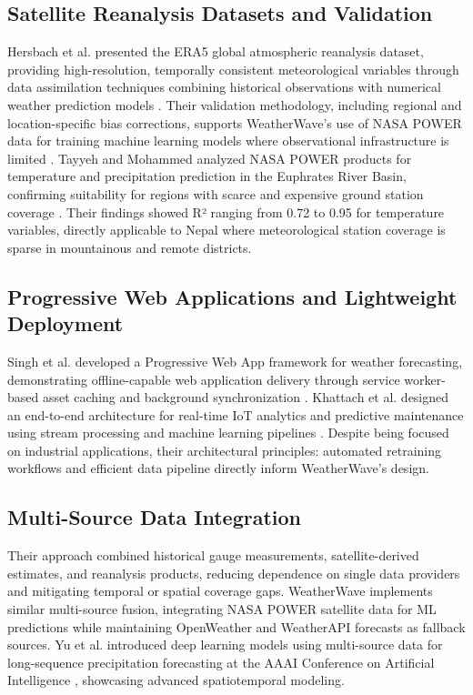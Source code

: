 \documentclass[conference]{IEEEtran}
\begin{document}
\subsection{Satellite Reanalysis Datasets and Validation}
Hersbach et al. presented the ERA5 global atmospheric reanalysis dataset, providing high-resolution, temporally consistent meteorological variables through data assimilation techniques combining historical observations with numerical weather prediction models \cite{b5}. 
Their validation methodology, including regional and location-specific bias corrections, supports WeatherWave's use of NASA POWER data for training machine learning models where observational infrastructure is limited \cite{b6}.
Tayyeh and Mohammed analyzed NASA POWER products for temperature and precipitation prediction in the Euphrates River Basin, confirming suitability for regions with scarce and expensive ground station coverage \cite{b7}. Their findings showed R² ranging from 0.72 to 0.95 for temperature variables, directly applicable to Nepal where meteorological station coverage is sparse in mountainous and remote districts.
\subsection{Progressive Web Applications and Lightweight Deployment}
Singh et al. developed a Progressive Web App framework for weather forecasting, demonstrating offline-capable web application delivery through service worker-based asset caching and background synchronization \cite{b8}.
Khattach et al. designed an end-to-end architecture for real-time IoT analytics and predictive maintenance using stream processing and machine learning pipelines \cite{b9}. Despite being focused on industrial applications, their architectural principles: automated retraining workflows and efficient data pipeline directly inform WeatherWave's design. 
\subsection{Multi-Source Data Integration}
 Their \cite{b10} approach combined historical gauge measurements, satellite-derived estimates, and reanalysis products, reducing dependence on single data providers and mitigating temporal or spatial coverage gaps. WeatherWave implements similar multi-source fusion, integrating NASA POWER satellite data for ML predictions while maintaining OpenWeather and WeatherAPI forecasts as fallback sources.
Yu et al. introduced deep learning models using multi-source data for long-sequence precipitation forecasting at the AAAI Conference on Artificial Intelligence \cite{b11}, showcasing advanced spatiotemporal modeling. 
\end{document}
